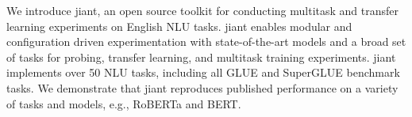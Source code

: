 We introduce jiant, an open source toolkit for conducting multitask and transfer learning experiments on English NLU tasks. jiant enables modular and configuration driven experimentation with state-of-the-art models and a broad set of tasks for probing, transfer learning, and multitask training experiments. jiant implements over 50 NLU tasks, including all GLUE and SuperGLUE benchmark tasks. We demonstrate that jiant reproduces published performance on a variety of tasks and models, e.g., RoBERTa and BERT.
